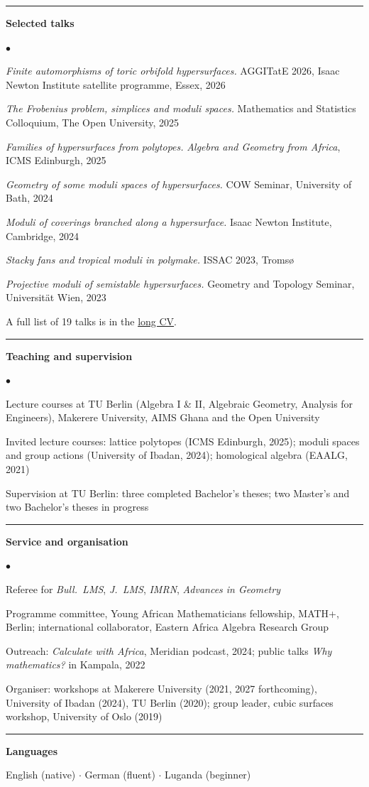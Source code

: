\documentclass[10pt]{article}
\newcommand{\cvsection}[1]{%
  \par\vspace{0.24cm}%
  \noindent\rule{\textwidth}{0.4pt}%
  \par\vspace{0.10cm}%
  \noindent\textbf{\large #1}%
  \par\vspace{0.10cm}%
}
\newenvironment{cvlist}%
  {\begin{list}{$\bullet$}{%
     \setlength{\leftmargin}{1.1em}\setlength{\labelwidth}{0.8em}%
     \setlength{\itemsep}{0.10cm}\setlength{\parsep}{0pt}%
     \setlength{\topsep}{0pt}\setlength{\partopsep}{0pt}}}%
  {\end{list}}
\begin{document}
\cvsection{Selected talks}
\begin{cvlist}
\item {\em Finite automorphisms of toric orbifold hypersurfaces.}
AGGITatE 2026, Isaac Newton Institute satellite programme, Essex, 2026
\item {\em The Frobenius problem, simplices and moduli spaces.}
Mathematics and Statistics Colloquium, The Open University, 2025
\item {\em Families of hypersurfaces from polytopes.}
{\em Algebra and Geometry from Africa}, ICMS Edinburgh, 2025
\item {\em Geometry of some moduli spaces of hypersurfaces.}
COW Seminar, University of Bath, 2024
\item {\em Moduli of coverings branched along a hypersurface.}
Isaac Newton Institute, Cambridge, 2024
\item {\em Stacky fans and tropical moduli in polymake.} ISSAC 2023, Troms\o
\item {\em Projective moduli of semistable hypersurfaces.}
Geometry and Topology Seminar, Universit\"at Wien, 2023
\end{cvlist}
{\small A full list of 19 talks is in the \href{https://dombunnett.github.io/cv/cv.pdf}{long CV}.}

\cvsection{Teaching and supervision}
\begin{cvlist}
\item Lecture courses at TU Berlin (Algebra I \& II, Algebraic Geometry,
Analysis for Engineers), Makerere University, AIMS Ghana and the Open University
\item Invited lecture courses: lattice polytopes (ICMS Edinburgh, 2025);
moduli spaces and group actions (University of Ibadan, 2024);
homological algebra (EAALG, 2021)
\item Supervision at TU Berlin: three completed Bachelor's theses;
two Master's and two Bachelor's theses in progress
\end{cvlist}

\cvsection{Service and organisation}
\begin{cvlist}
\item Referee for {\em Bull.\ LMS}, {\em J.\ LMS}, {\em IMRN},
{\em Advances in Geometry}
\item Programme committee, Young African Mathematicians fellowship, MATH+, Berlin;
international collaborator, Eastern Africa Algebra Research Group
\item Outreach: {\em Calculate with Africa}, Meridian podcast, 2024;
public talks {\em Why mathematics?} in Kampala, 2022
\item Organiser: workshops at Makerere University (2021, 2027 forthcoming),
University of Ibadan (2024), TU Berlin (2020); group leader, cubic surfaces
workshop, University of Oslo (2019)
\end{cvlist}

\cvsection{Languages}
English (native) \quad $\cdot$ \quad German (fluent) \quad $\cdot$ \quad Luganda (beginner)
\end{document}
